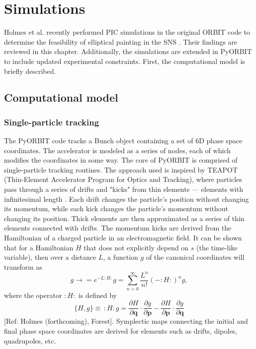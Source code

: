 \chapter{Simulations} \label{chap-3}

Holmes et al. recently performed PIC simulations in the original ORBIT code to determine the feasibility of elliptical painting in the SNS \cite{Holmes2018}. Their findings are reviewed in this chapter. Additionally, the simulations are extended in PyORBIT to include updated experimental constraints. First, the computational model is briefly described. 


\section{Computational model}


\subsection{Single-particle tracking}

The PyORBIT code tracks a Bunch object containing a set of 6D phase space coordinates. The accelerator is modeled as a series of nodes, each of which modifies the coordinates in some way. The core of PyORBIT is comprised of single-particle tracking routines. The approach used is inspired by TEAPOT (Thin-Element Accelerator Program for Optics and Tracking), where particles pass through a series of drifts and "kicks" from thin elements — elements with infinitesimal length \cite{Schachinger1987}. Each drift changes the particle's position without changing its momentum, while each kick changes the particle's momentum without changing its position. Thick elements are then approximated as a series of thin elements connected with drifts. The momentum kicks are derived from the Hamiltonian of a charged particle in an electromagnetic field. It can be shown that for a Hamiltonian $H$ that does not explicitly depend on $s$ (the time-like variable), then over a distance $L$, a function $g$ of the canonical coordinates will transform as
%
\begin{equation}
    g \rightarrow 
    = e^{-L:H:} g
    = \sum_{n=0}^{\infty}{\frac{L^n}{n!} (-:H:)^n g},
\end{equation}
%
where the operator $:H:$ is defined by
%
\begin{equation}
    \{H, g\} \equiv \, :H: g =
    \frac{\partial{H}}{\partial{\mathbf{q}}}
    \cdot
    \frac{\partial{g}}{\partial{\mathbf{p}}}
    -
    \frac{\partial{H}}{\partial{\mathbf{p}}}
    \cdot
    \frac{\partial{g}}{\partial{\mathbf{q}}}
\end{equation}
%
[Ref: Holmes (forthcoming), Forest]. Symplectic maps connecting the initial and final phase space coordinates are derived for elements such as drifts, dipoles, quadrupoles, etc.

